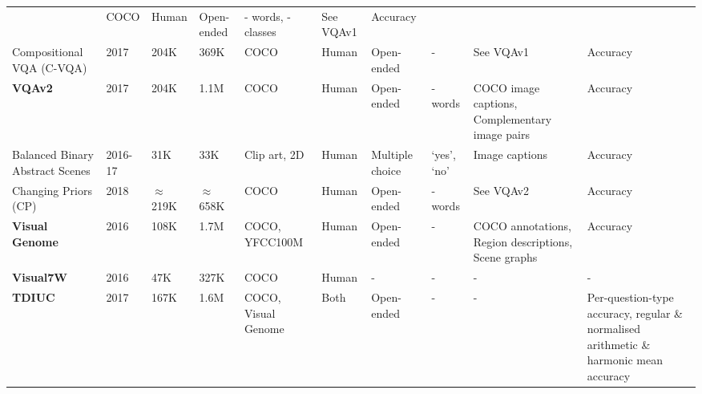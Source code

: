 \begin{landscape}
\begin{center}
\begin{xltabular}{\linewidth}{LLLLLLLLLL}
      & COCO
      & Human
      & Open-ended
      & {\color{red}- words, - classes}
      & See VQAv1
      & Accuracy\footnotemark[\value{footnote}] \\
      Compositional VQA (C-VQA) \cite{agrawal2017cvqa}
      & 2017
      & 204K  %
      & 369K  %
      & COCO
      & Human
      & Open-ended
      & -
      & See VQAv1
      & Accuracy\footnotemark[\value{footnote}] \\
      \textbf{VQAv2} \cite{goyal2017making}
      & 2017
      & 204K  %
      & 1.1M  %
      & COCO
      & Human
      & Open-ended
      & {\color{red}- words}
      & COCO image captions, Complementary image pairs
      & Accuracy\footnotemark[\value{footnote}] \\
      Balanced Binary Abstract Scenes \cite{zhang2016yin}
      & 2016-17
      & 31K %
      & 33K %
      & Clip art, 2D
      & Human
      & Multiple choice
      & `yes', `no'
      & Image captions
      & Accuracy\footnotemark[\value{footnote}] \\
      Changing Priors (CP) \cite{agrawal2018dont}
      & 2018
      & {\color{red}\(\approx\)219K}  %
      & {\color{red}\(\approx\)658K}  %
      & COCO
      & Human
      & Open-ended
      & {\color{red}- words}
      & See VQAv2
      & Accuracy\footnotemark[\value{footnote}] \\
      \textbf{Visual Genome} \cite{krishna2017visual}
      & 2016
      & 108K  %
      & 1.7M  %
      & COCO, YFCC100M \cite{thomee2016yfcc100m}
      & Human
      & Open-ended
      & -
      & COCO annotations, Region descriptions, Scene graphs
      & Accuracy \\
      \textbf{Visual7W} \cite{zhu2016visual7w}
      & 2016
      & 47K %
      & 327K %
      & COCO
      & Human
      & -
      & -
      & - %
      & - \\
      \textbf{TDIUC} \cite{kafle2017analysis}
      & 2017
      & 167K %
      & 1.6M %
      & COCO, Visual Genome
      & Both
      & Open-ended
      & -
      & -
      & Per-question-type accuracy, regular \& normalised arithmetic \& harmonic mean accuracy\\

\end{xltabular}
\end{center}
\end{landscape}
